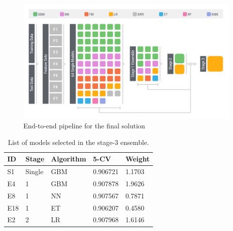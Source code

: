 \begin{figure}[!t]
  \centering
    \includegraphics[width=1 \textwidth]{ensemble}
      \caption{End-to-end pipeline for the final solution}
\end{figure}

\begin{table}
\begin{center}
	\caption{List of models selected in the stage-3 ensemble.}
\begin{tabular}{lllll}
ID 	& Stage 	& Algorithm 	& 5-CV 		& Weight\\ \hline
S1 	& Single	& GBM		& 0.906721 	& 1.1703 \\
E4 	& 1 		& GBM		& 0.907878 	& 1.9626\\
E8 	& 1 		& NN		& 0.907567	& 0.7871\\
E18	& 1		& ET			& 0.906207 	& 0.4580\\
E2	& 2 		& LR			& 0.907968 	& 1.6146\\
\end{tabular}

\label{tb:finalEnsemble}
\end{center}
\end{table}
